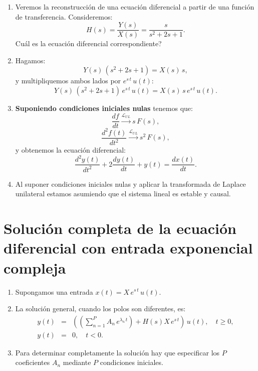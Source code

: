 \documentclass[11pt,a4paper,openany]{book}
\begin{document}
\begin{enumerate}
	\item Veremos la reconstrucci\'{o}n de una ecuaci\'{o}n diferencial a partir de una funci\'{o}n de transferencia. Consideremos: 
	\begin{equation}
		H\left( s\right) = \frac{Y(s)}{X(s)}=\frac{s}{s^{2}+2s+1}.
	\end{equation}
	\textquestiondown Cu\'{a}l es la ecuaci\'{o}n diferencial correspondiente?
	
	\item Hagamos: 
	\begin{equation}
		Y(s) \, \left( s^{2}+2s+1\right) = X(s) \, s,
	\end{equation}
	y multipliquemos ambos lados por $e^{s \, t} \, u(t)$:
	\begin{equation}
		Y(s) \, \left( s^{2}+2s+1\right) \, e^{s\, t} \, u(t) = X(s) \, s \, e^{s \, t} \, u(t).
	\end{equation}
	
	\item \textbf{Suponiendo condiciones iniciales nulas} tenemos que:
	\begin{equation}
		\frac{df}{dt} \xrightarrow{\mathcal{L}_{UL}} s \, F(s),
	\end{equation}
	\begin{equation}
		\frac{d^{2}f(t)}{dt^{2}} \xrightarrow{\mathcal{L}_{UL}} s^{2} \, F(s),
	\end{equation}
	y obtenemos la ecuaci\'{o}n diferencial: 
	\begin{equation}
		\frac{d^{2}y\left( t\right) }{dt^{2}} + 2\frac{dy\left( t\right) }{dt} + y\left( t\right) = \frac{dx\left( t\right) }{dt}.
	\end{equation}
	
	\item Al suponer condiciones iniciales nulas y aplicar la transformada de Laplace unilateral estamos asumiendo que el sistema lineal es estable y causal.
\end{enumerate}

\section{Soluci\'{o}n completa de la ecuaci\'{o}n diferencial con entrada exponencial compleja}

\begin{enumerate}
	\item Supongamos una entrada $x(t) = X \, e^{s \, t} \, u(t)$.
	\item La soluci\'{o}n general, cuando los polos son diferentes, es: 
	\begin{eqnarray}
		y\left( t\right) &=& \left(\left( \sum_{n=1}^{P}A_{n} \, e^{\lambda_{n} \, t}\right) + H\left( s\right) X \, e^{s \, t}\right) \, u(t), \quad t\geq 0, \\
		y\left( t\right) &=& 0, \quad t<0.
	\end{eqnarray}
	
	\item Para determinar completamente la soluci\'{o}n hay que especificar los $P$ coeficientes $A_{n}$ mediante $P$ condiciones iniciales.
\end{enumerate}
\end{document}
